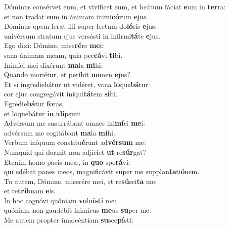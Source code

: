\evenverse Dóminus consérvet eum, et vivíficet eum, et beátum fáciat \textbf{e}um in \textbf{ter}ra:~\*\\
\evenverse et non tradat eum in ánimam inimi\textbf{có}rum \textbf{e}jus.\\
\oddverse Dóminus opem ferat illi super lectum do\textbf{ló}ris \textbf{e}jus:~\*\\
\oddverse univérsum stratum ejus versásti in infirmi\textbf{tá}te \textbf{e}jus.\\
\evenverse Ego dixi: Dómine, mise\textbf{ré}re \textbf{me}i:~\*\\
\evenverse sana ánimam meam, quia pec\textbf{cá}vi \textbf{ti}bi.\\
\oddverse Inimíci mei dixérunt \textbf{ma}la \textbf{mi}hi:~\*\\
\oddverse Quando moriétur, et períbit \textbf{no}men \textbf{e}jus?\\
\evenverse Et si ingrediebátur ut vidéret, vana \textbf{lo}que\textbf{bá}tur:~\*\\
\evenverse cor ejus congregávit iniqui\textbf{tá}tem \textbf{si}bi.\\
\oddverse Egredie\textbf{bá}tur \textbf{fo}ras,~\*\\
\oddverse et loquebátur \textbf{in} i\textbf{dí}psum.\\
\evenverse Advérsum me susurrábant omnes ini\textbf{mí}ci \textbf{me}i:~\*\\
\evenverse advérsum me cogitábant \textbf{ma}la \textbf{mi}hi.\\
\oddverse Verbum iníquum constitu\textbf{é}runt ad\textbf{vér}\textbf{sum} me:~\*\\
\oddverse Numquid qui dormit non adjíciet \textbf{ut} re\textbf{súr}gat?\\
\evenverse Etenim homo pacis meæ, in \textbf{quo} spe\textbf{rá}vi:~\*\\
\evenverse qui edébat panes meos, magnificávit super me supplan\textbf{ta}ti\textbf{ó}nem.\\
\oddverse Tu autem, Dómine, miserére mei, et re\textbf{sú}sci\textbf{ta} me:~\*\\
\oddverse et re\textbf{trí}buam \textbf{e}is.\\
\evenverse In hoc cognóvi quóniam \textbf{vo}lu\textbf{í}\textbf{sti} me:~\*\\
\evenverse quóniam non gaudébit inimícus \textbf{me}us \textbf{su}per me.\\
\oddverse Me autem propter innocéntiam \textbf{su}sce\textbf{pí}sti:~\*\\
